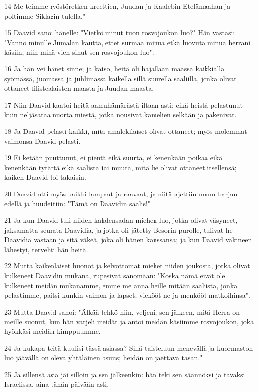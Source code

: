 \par 14 Me teimme ryöstöretken kreettien, Juudan ja Kaalebin Etelämaahan ja poltimme Siklagin tulella."
\par 15 Daavid sanoi hänelle: "Vietkö minut tuon rosvojoukon luo?" Hän vastasi: "Vanno minulle Jumalan kautta, ettet surmaa minua etkä luovuta minua herrani käsiin, niin minä vien sinut sen rosvojoukon luo".
\par 16 Ja hän vei hänet sinne; ja katso, heitä oli hajallaan maassa kaikkialla syömässä, juomassa ja juhlimassa kaikella sillä suurella saaliilla, jonka olivat ottaneet filistealaisten maasta ja Juudan maasta.
\par 17 Niin Daavid kaatoi heitä aamuhämärästä iltaan asti; eikä heistä pelastunut kuin neljäsataa nuorta miestä, jotka nousivat kamelien selkään ja pakenivat.
\par 18 Ja Daavid pelasti kaikki, mitä amalekilaiset olivat ottaneet; myös molemmat vaimonsa Daavid pelasti.
\par 19 Ei ketään puuttunut, ei pientä eikä suurta, ei kenenkään poikaa eikä kenenkään tytärtä eikä saalista tai muuta, mitä he olivat ottaneet itsellensä; kaiken Daavid toi takaisin.
\par 20 Daavid otti myös kaikki lampaat ja raavaat, ja niitä ajettiin muun karjan edellä ja huudettiin: "Tämä on Daavidin saalis!"
\par 21 Ja kun Daavid tuli niiden kahdensadan miehen luo, jotka olivat väsyneet, jaksamatta seurata Daavidia, ja jotka oli jätetty Besorin purolle, tulivat he Daavidia vastaan ja sitä väkeä, joka oli hänen kanssansa; ja kun Daavid väkineen lähestyi, tervehti hän heitä.
\par 22 Mutta kaikenlaiset huonot ja kelvottomat miehet niiden joukosta, jotka olivat kulkeneet Daavidin mukana, rupesivat sanomaan: "Koska nämä eivät ole kulkeneet meidän mukanamme, emme me anna heille mitään saaliista, jonka pelastimme, paitsi kunkin vaimon ja lapset; viekööt ne ja menkööt matkoihinsa".
\par 23 Mutta Daavid sanoi: "Älkää tehkö niin, veljeni, sen jälkeen, mitä Herra on meille suonut, kun hän varjeli meidät ja antoi meidän käsiimme rosvojoukon, joka hyökkäsi meidän kimppuumme.
\par 24 Ja kukapa teitä kuulisi tässä asiassa? Sillä taisteluun menevällä ja kuormaston luo jäävällä on oleva yhtäläinen osuus; heidän on jaettava tasan."
\par 25 Ja sillensä asia jäi silloin ja sen jälkeenkin: hän teki sen säännöksi ja tavaksi Israelissa, aina tähän päivään asti.
